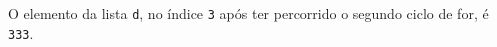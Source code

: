 \documentclass[12pt,varwidth=16cm,border=1pt]{standalone}
\begin{document}
O elemento da lista \verb+d+, no índice \verb+3+ após ter percorrido o segundo ciclo de for, é \verb+333+.

\questiomfalse
\end{document}
